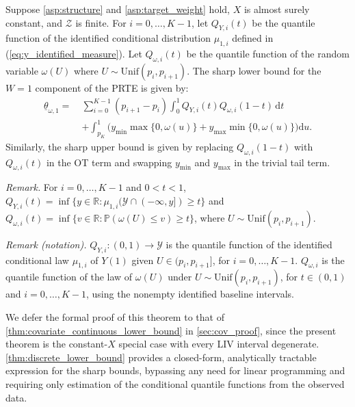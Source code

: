 \begin{theorem}\label{thm:discrete_lower_bound}
    Suppose \cref{asp:structure} and \cref{asp:target_weight} hold, $X$ is almost surely constant, and $\mathcal{Z}$ is finite. For $i=0, \dots, K-1$, let $Q_{Y, i}(t)$ be the quantile function of the identified conditional distribution $\mu_{1, i}$ defined in (\ref{eq:y_identified_measure}). Let $Q_{\omega, i}(t)$ be the quantile function of the random variable $\omega(U)$ where $U \sim \text{Unif}(p_i, p_{i+1})$. The sharp lower bound for the $W=1$ component of the PRTE is given by:
    \begin{equation}\label{eq:discrete_lower_bound}
        \begin{split}
            \underline{\theta}_{\omega, 1} = \ & \sum_{i=0}^{K-1} (p_{i+1} - p_i) \int_0^1 Q_{Y, i}(t) Q_{\omega, i}(1-t) \, \mathrm{d}t \\
            & + \int_{p_K}^1 \Big( y_{\min} \max\{0, \omega(u)\} + y_{\max} \min\{0, \omega(u)\} \Big) \mathrm{d}u.
        \end{split}
    \end{equation}
    Similarly, the sharp upper bound is given by replacing $Q_{\omega,i}(1-t)$ with $Q_{\omega,i}(t)$ in the OT term and swapping $y_{\min}$ and $y_{\max}$ in the trivial tail term.

\end{theorem}

\noindent\textit{Remark.} For $i=0,\ldots,K-1$ and $0<t<1$, $Q_{Y,i}(t)=\inf\{y\in\mathbb R:\mu_{1,i}(\mathcal Y\cap(-\infty,y])\geqslant t\}$ and $Q_{\omega,i}(t)=\inf\{v\in\mathbb R:\mathbb P(\omega(U)\leqslant v)\geqslant t\}$, where $U\sim\mathrm{Unif}(p_i,p_{i+1})$.

\noindent\textit{Remark (notation).} $Q_{Y,i}:(0,1)\to\mathcal Y$ is the quantile function of the identified conditional law $\mu_{1,i}$ of $Y(1)$ given $U\in(p_i,p_{i+1}]$, for $i=0,\ldots,K-1$. $Q_{\omega,i}$ is the quantile function of the law of $\omega(U)$ under $U\sim\mathrm{Unif}(p_i,p_{i+1})$, for $t\in(0,1)$ and $i=0,\ldots,K-1$, using the nonempty identified baseline intervals.


We defer the formal proof of this theorem to that of \cref{thm:covariate_continuous_lower_bound} in \cref{sec:cov_proof}, since the present theorem is the constant-$X$ special case with every LIV interval degenerate. \cref{thm:discrete_lower_bound} provides a closed-form, analytically tractable expression for the sharp bounds, bypassing any need for linear programming and requiring only estimation of the conditional quantile functions from the observed data.

